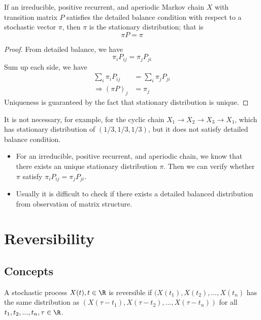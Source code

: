 \begin{refsection}
\begin{theorem}\label{ch:markov-chains:th:detailedbalance}\cite[230]{robert2013monte}
If an irreducible, positive recurrent, and aperiodic Markov chain $X$ with transition matrix $P$  satisfies the detailed balance condition with respect to a stochastic vector $\pi$, then $\pi$ is the stationary distribution; that is
$$\pi P = \pi$$
\end{theorem}
\begin{proof}
From detailed balance, we have
$$\pi_i P_{ij} = \pi_j P_{ji}$$
Sum up each side, we have
\begin{align*}
\sum_i \pi_i P_{ij} &= \sum_i\pi_j P_{ji}\\
\Rightarrow (\pi P)_j &= \pi_j
\end{align*}
Uniqueness is guaranteed by the fact that stationary distribution is unique.
\end{proof}

\begin{remark}
It is not necessary, for example, for the cyclic chain $X_1\to X_2\to X_3\to X_1$, which has stationary distribution of $(1/3,1/3,1/3)$, but it does not satisfy detailed balance condition.
\end{remark}


\begin{remark}\hfill
\begin{itemize}
	\item For an irreducible, positive recurrent, and aperiodic chain, we know that there exists an unique stationary distribution $\pi$. Then we can verify whether $\pi$ satisfy $\pi_i P_{ij} = \pi_j P_{ji}$.
	\item Usually it is difficult to check if there exists a detailed balanced distribution from observation of matrix structure.
\end{itemize}
 
\end{remark}



\section{Reversibility}
\subsection{Concepts}
\begin{definition}\cite[5]{kelly2011reversibility}
	A stochastic process $X(t), t\in \R$ is reversible if $(X(t_1),X(t_2),...,X(t_n)$ has the same distribution as
	$(X(\tau-t_1),X(\tau-t_2),...,X(\tau - t_n))$ for all $t_1,t_2,...,t_n,\tau \in \R$.	
\end{definition}



\end{refsection}
